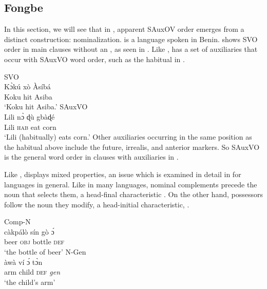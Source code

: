 \documentclass[output=paper,newtxmath,modfonts,nonflat,draftmode]{langsci/langscibook}
\begin{document}
\subsection{Fongbe}

 In this section, we will see that in , apparent SAuxOV order emerges from a distinct construction: nominalization.   is a  language spoken in Benin.  shows SVO order in main clauses without an , as seen in . Like ,  has a set of auxiliaries that occur with SAuxVO word order, such as the habitual in .%

\ea \label{ex:Fongbe-SVO}  
{SVO}\\
\ea 
\gll K{{\`ɔ}kú} xò Àsíbá \\
Koku hit Asiba \\
\glt `Koku hit Asiba.' \hfill \citep[][247]{lefebvre2002}
\ex \label{ex:Fongbe-SAuxVO}
 {SAuxVO}\\
\gll Lili {n{\`ɔ}} {ɖù} {gbàɖé}  \\
Lili \textsc{hab} eat corn \\
\glt `Lili (habitually) eats corn.' \hfill \citep[][94]{lefebvre2002}
\z
\z 
Other auxiliaries occurring in the same position as the habitual above include the future, irrealis, and anterior markers. So SAuxVO is the general word order in clauses with auxiliaries in .

Like ,  displays mixed  properties, an issue which is examined in detail in \citet{aboh04} for  languages in general. Like in many  languages,  nominal complements precede the noun that selects them, a head-final characteristic . On the other hand, possessors follow the noun they modify, a head-initial characteristic, .

\ea
\ea  \label{ex:Fongbe-CompN} {Comp-N}\\
\gll càkpálò sín gò {\'ɔ} \\
beer \textsc{obj} bottle \textsc{def} \\
\glt `the bottle of beer' \hfill \citep[][45]{lefebvre2002}
\ex \label{ex:Fongbe-NGen} {N-Gen}\\
\gll àwà ví {\'ɔ} {t{\`ɔ}n} \\
arm child \textsc{def} \textit{gen} \\
\glt `the child's arm' \hfill \citep[][45]{lefebvre2002}
\z
\z 
\end{document}
